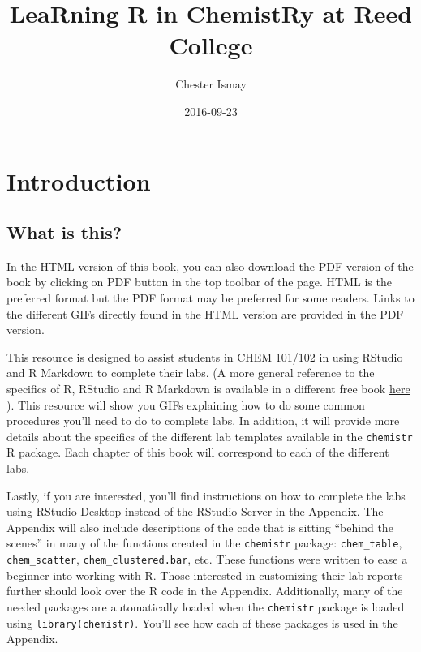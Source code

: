 \documentclass[]{tufte-book}
\title{LeaRning R in ChemistRy at Reed College}
\author{Chester Ismay}
\date{2016-09-23}
\begin{document}
\maketitle



{
\setcounter{tocdepth}{1}
\tableofcontents
}

\chapter*{Introduction}\label{introduction}

\section*{What is this?}\label{what-is-this}

In the HTML version of this book, you can also download the PDF version
of the book by clicking on PDF button in the top toolbar of the page.
HTML is the preferred format but the PDF format may be preferred for
some readers. Links to the different GIFs directly found in the HTML
version are provided in the PDF version.

This resource is designed to assist students in CHEM 101/102 in using
RStudio and R Markdown to complete their labs. (A more general reference
to the specifics of R, RStudio and R Markdown is available in a
different free book \href{http://ismayc.github.io/rbasics-book}{here}
\citep{usedtor2016}). This resource will show you GIFs explaining how to
do some common procedures you'll need to do to complete labs. In
addition, it will provide more details about the specifics of the
different lab templates available in the \texttt{chemistr} R package.
Each chapter of this book will correspond to each of the different labs.

Lastly, if you are interested, you'll find instructions on how to
complete the labs using RStudio Desktop instead of the RStudio Server in
the Appendix. The Appendix will also include descriptions of the code
that is sitting ``behind the scenes'' in many of the functions created
in the \texttt{chemistr} package: \texttt{chem\_table},
\texttt{chem\_scatter}, \texttt{chem\_clustered.bar}, etc. These
functions were written to ease a beginner into working with R. Those
interested in customizing their lab reports further should look over the
R code in the Appendix. Additionally, many of the needed packages are
automatically loaded when the \texttt{chemistr} package is loaded using
\texttt{library(chemistr)}. You'll see how each of these packages is
used in the Appendix.
\end{document}
